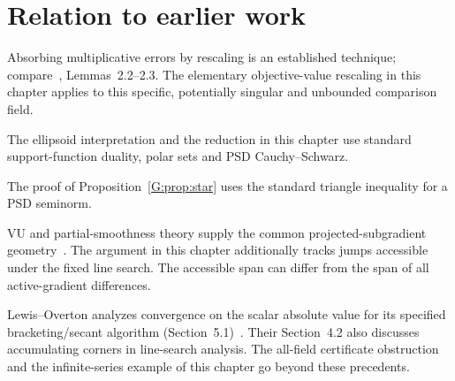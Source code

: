 \endgroup


\section*{Relation to earlier work}
Absorbing multiplicative errors by rescaling is an established technique; compare~\cite{FND_CV13}, Lemmas~2.2--2.3. The elementary objective-value rescaling in this chapter applies to this specific, potentially singular and unbounded comparison field.

The ellipsoid interpretation and the reduction in this chapter use standard support-function duality, polar sets and PSD Cauchy--Schwarz.

The proof of Proposition~\ref{G:prop:star} uses the standard triangle inequality for a PSD seminorm.

VU and partial-smoothness theory supply the common projected-subgradient geometry~\cite{geom_Lewis2002,LL}. The argument in this chapter additionally tracks jumps accessible under the fixed line search. The accessible span can differ from the span of all active-gradient differences.

Lewis--Overton analyzes convergence on the scalar absolute value for its specified bracketing/secant algorithm (Section~5.1)~\cite{LO}. Their Section~4.2 also discusses accumulating corners in line-search analysis. The all-field certificate obstruction and the infinite-series example of this chapter go beyond these precedents.

